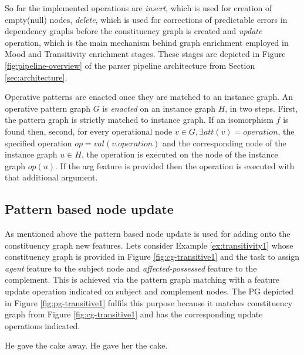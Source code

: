 So far the implemented operations are \textit{insert}, which is used for creation of empty(null) nodes, \textit{delete}, which is used for corrections of predictable errors in dependency graphs before the constituency graph is created and \textit{update} operation, which is the main mechanism behind graph enrichment employed in Mood and Transitivity enrichment stages. These stages are depicted in Figure \ref{fig:pipeline-overview} of the parser pipeline architecture from Section \ref{sec:architecture}.

Operative patterns are enacted once they are matched to an instance graph. 
An operative pattern graph $G$ is \textit{enacted} on an instance graph $H$, in two steps. First, the pattern graph is strictly matched to instance graph. If an isomorphism $f$ is found then, second, for every operational node $v \in G, \exists att(v)=operation$, the specified operation $op = val(v.operation)$ and the corresponding node of the instance graph $u \in H$, the operation is executed on the node of the instance graph $op(u)$. If the arg feature is provided then the operation is executed with that additional argument. 

\subsection{Pattern based node update} 

As mentioned above the pattern based node update is used for adding onto the constituency graph new features. Lets consider Example \ref{ex:transitivity1} whose constituency graph is provided in Figure \ref{fig:cg-transitive1} and the task to assign \textit{agent} feature to the subject node and \textit{affected-possessed} feature to the complement. This is achieved via the pattern graph matching with a feature update operation indicated on subject and complement nodes. The PG depicted in Figure \ref{fig:pg-transitive1} fulfils this purpose because it matches constituency graph from Figure \ref{fig:cg-transitive1} and has the corresponding update operations indicated.

\begin{exe}
    \ex\label{ex:transitivity1} He gave the cake away.
    \ex\label{ex:transitivity2} He gave her the cake.
\end{exe}


